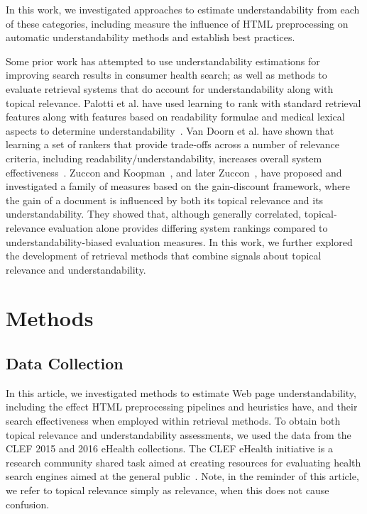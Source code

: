 \documentclass[10pt,a4paper]{article}
\begin{document}
In this work, we investigated approaches to estimate understandability from each of these categories, including measure the influence of HTML preprocessing on automatic understandability methods and establish best practices. 

Some prior work has attempted to use understandability estimations for improving search results in consumer health search; as well as methods to evaluate retrieval systems that do account for understandability along with topical relevance. Palotti et al. have used learning to rank with standard retrieval features along with features based on readability formulae and medical lexical aspects to determine understandability~\cite{palotti2016ranking}. Van Doorn et al. have shown that learning a set of rankers that provide trade-offs across a number of relevance criteria, including readability/understandability, increases overall system effectiveness~\cite{van2016balancing}.
Zuccon and Koopman~\cite{zuccon14}, and later Zuccon~\cite{zuccon2016understandability}, have proposed and investigated a family of measures based on the gain-discount framework, where the gain of a document is influenced by both its topical relevance and its understandability. They showed that, although generally correlated, topical-relevance evaluation alone provides differing system rankings compared to understandability-biased evaluation measures. 
In this work, we further explored the development of retrieval methods that combine signals about topical relevance and understandability. 


\section*{Methods}
\label{sec:data}

\subsection*{Data Collection}

In this article, we investigated methods to estimate Web page understandability, including the effect HTML preprocessing pipelines and heuristics have, and their search effectiveness when employed within retrieval methods. To obtain both topical relevance and  understandability assessments, we used the data from the CLEF 2015 and 2016 eHealth collections. The CLEF eHealth initiative is a research community shared task aimed at creating resources for evaluating health search engines aimed at the general public~\cite{clefWebSite}. Note, in the reminder of this article, we refer to topical relevance simply as relevance, when this does not cause confusion.
\end{document}
